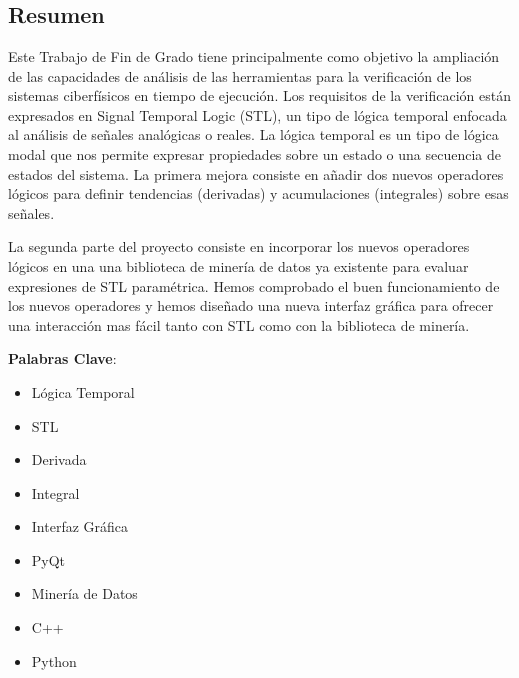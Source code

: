 \chapter*{}

\section*{Resumen}
Este Trabajo de Fin de Grado tiene principalmente como objetivo la ampliación de las capacidades de análisis de las herramientas para la verificación de los sistemas ciberfísicos en tiempo de ejecución. Los requisitos de la verificación están expresados en  Signal Temporal Logic (STL), un tipo de lógica temporal enfocada al análisis de señales analógicas o reales. La lógica temporal es un tipo de lógica modal que nos permite expresar propiedades sobre un estado o una secuencia de estados del sistema. La primera mejora consiste en añadir dos nuevos operadores lógicos para definir tendencias (derivadas) y acumulaciones (integrales) sobre esas señales.


La segunda parte del proyecto consiste en incorporar los nuevos operadores lógicos en una una biblioteca de minería de datos ya existente para evaluar expresiones de STL paramétrica. Hemos comprobado el buen funcionamiento de los nuevos operadores y hemos diseñado una nueva interfaz gráfica para ofrecer una interacción mas fácil tanto con STL como con la biblioteca de minería.

\textbf{Palabras Clave}:
\begin{itemize}
\item Lógica Temporal
\item STL
\item Derivada
\item Integral
\item Interfaz Gráfica
\item PyQt
\item Minería de Datos 
\item C++
\item Python
\end{itemize}
\newpage

